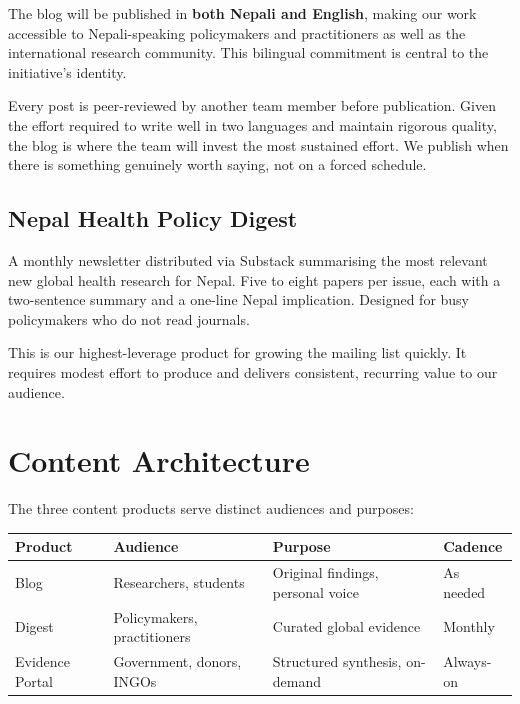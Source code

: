 \documentclass[11pt, a4paper]{article}
\begin{document}
The blog will be published in \textbf{both Nepali and English}, making our work accessible to Nepali-speaking policymakers and practitioners as well as the international research community. This bilingual commitment is central to the initiative's identity.

Every post is peer-reviewed by another team member before publication. Given the effort required to write well in two languages and maintain rigorous quality, the blog is where the team will invest the most sustained effort. We publish when there is something genuinely worth saying, not on a forced schedule.

\subsection{Nepal Health Policy Digest}

A monthly newsletter distributed via Substack summarising the most relevant new global health research for Nepal. Five to eight papers per issue, each with a two-sentence summary and a one-line Nepal implication. Designed for busy policymakers who do not read journals.

This is our highest-leverage product for growing the mailing list quickly. It requires modest effort to produce and delivers consistent, recurring value to our audience.

\section{Content Architecture}

The three content products serve distinct audiences and purposes:

\medskip
\begin{center}
\small
\begin{tabular}{p{2.8cm}p{4cm}p{4.5cm}p{2.2cm}}
\toprule
\textbf{Product} & \textbf{Audience} & \textbf{Purpose} & \textbf{Cadence} \\
\midrule
Blog & Researchers, students & Original findings, personal voice & As needed \\[4pt]
Digest & Policymakers, practitioners & Curated global evidence & Monthly \\[4pt]
Evidence Portal & Government, donors, INGOs & Structured synthesis, on-demand & Always-on \\
\bottomrule
\end{tabular}
\end{center}
\medskip
\end{document}
